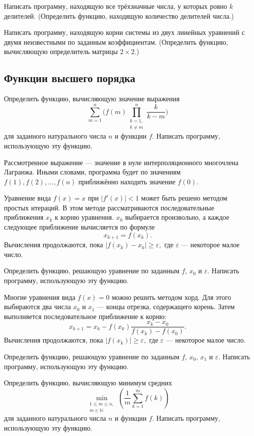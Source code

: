 \task Написать программу, находящую все трёхзначные числа, у которых
ровно $k$ делителей. (Определить функцию, находящую количество
делителей числа.)

\task Написать программу, находящую корни системы из двух линейных
уравнений с двумя неизвестными по заданным
коэффициентам. (Определить функцию, вычисляющую определитель матрицы
$2\times 2.$)


\subsection{Функции высшего порядка}

\task Определить функцию, вычисляющую значение выражения
\[
\sum_{m=1}^n\bigg(
f(m)
\prod_{\substack{k=1,\\k\neq m}}^n
\frac{k}{k-m}
\bigg)
\]
для заданного натурального числа $n$ и функции $f.$ Написать
программу, использующую эту функцию.

Рассмотренное выражение — значение в нуле интерполяционного многочлена
Лагранжа. Иными словами, программа будет по
значениям $f(1), f(2), \dots, f(n)$ приближённо находить значение
$f(0).$

\task Уравнение вида $f(x)=x$ при $|f'(x)|<1$ может быть решено
методом простых итераций. В этом методе
рассматриваются последовательные приближения $x_k$ к корню
уравнения. $x_0$ выбирается произвольно, а каждое следующее
приближение вычисляется по формуле
\[
x_{k+1} = f(x_k).
\]
Вычисления продолжаются, пока $|f(x_k) - x_k| \geqslant \varepsilon,$
где $\varepsilon$ — некоторое малое число.

Определить функцию, решающую уравнение по заданным $f$, $x_0$ и
$\varepsilon.$ Написать программу, использующую эту функцию.

\task Многие уравнения вида $f(x)=0$ можно решить методом
хорд. Для этого выбираются два числа $x_0$ и $x_1$ —
концы отрезка, содержащего корень. Затем выполняется последовательное
приближение к корню:
\[
x_{k+1} = x_k - f(x_k)\frac{x_k - x_0}{f(x_k) - f(x_0)}.
\] 
Вычисления продолжаются, пока $|f(x_k)| \geqslant \varepsilon,$
где $\varepsilon$ — некоторое малое число.

Определить функцию, решающую уравнение по заданным $f$, $x_0$, $x_1$ и
$\varepsilon.$ Написать программу, использующую эту функцию.

\task Определить функцию, вычисляющую минимум средних
\[
\min_{\substack{1\leqslant m\leqslant n,\\ m\in\mathbb{N}}}
\left(
\frac{1}{m}\sum_{k=1}^{m} f(k)
\right)
\]
для заданного натурального числа $n$ и функции $f.$ Написать
программу, использующую эту функцию.

